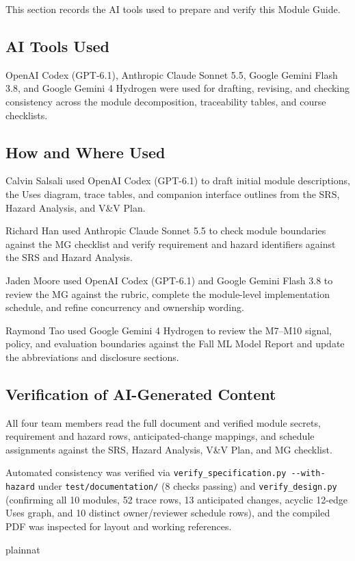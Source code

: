 \documentclass[12pt, titlepage]{article}
\begin{document}
This section records the AI tools used to prepare and verify this Module Guide.

\subsection{AI Tools Used}

\noindent OpenAI Codex (GPT-6.1), Anthropic Claude Sonnet 5.5, Google Gemini Flash 3.8, and Google Gemini 4 Hydrogen were used for drafting, revising, and checking consistency across the module decomposition, traceability tables, and course checklists.

\subsection{How and Where Used}

\noindent Calvin Salsali used OpenAI Codex (GPT-6.1) to draft initial module descriptions, the Uses diagram, trace tables, and companion interface outlines from the SRS, Hazard Analysis, and V\&V Plan.

\medskip\noindent Richard Han used Anthropic Claude Sonnet 5.5 to check module boundaries against the MG checklist and verify requirement and hazard identifiers against the SRS and Hazard Analysis.

\medskip\noindent Jaden Moore used OpenAI Codex (GPT-6.1) and Google Gemini Flash 3.8 to review the MG against the rubric, complete the module-level implementation schedule, and refine concurrency and ownership wording.

\medskip\noindent Raymond Tao used Google Gemini 4 Hydrogen to review the M7--M10 signal, policy, and evaluation boundaries against the Fall ML Model Report and update the abbreviations and disclosure sections.

\subsection{Verification of AI-Generated Content}

\noindent All four team members read the full document and verified module secrets, requirement and hazard rows, anticipated-change mappings, and schedule assignments against the SRS, Hazard Analysis, V\&V Plan, and MG checklist.

\medskip\noindent Automated consistency was verified via \texttt{verify\_specification.py -{}-with-hazard} under \texttt{test/documentation/} (8 checks passing) and \texttt{verify\_design.py} (confirming all 10 modules, 52 trace rows, 13 anticipated changes, acyclic 12-edge Uses graph, and 10 distinct owner/reviewer schedule rows), and the compiled PDF was inspected for layout and working references.

\newpage{}

 {plainnat}

\end{document}
